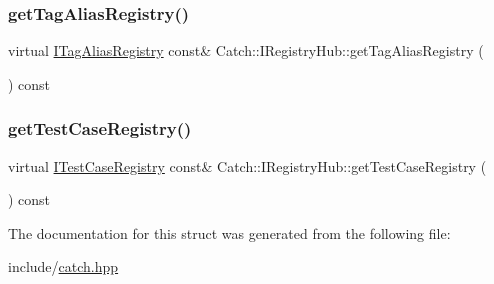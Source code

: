 \mbox{\label{struct_catch_1_1_i_registry_hub_a3c511b1d33e5a6d95c333a0ff387df1a}} 
\subsubsection{\texorpdfstring{get\+Tag\+Alias\+Registry()}{getTagAliasRegistry()}}
{\footnotesize\ttfamily virtual \mbox{\hyperlink{struct_catch_1_1_i_tag_alias_registry}{I\+Tag\+Alias\+Registry}} const\& Catch\+::\+I\+Registry\+Hub\+::get\+Tag\+Alias\+Registry (\begin{DoxyParamCaption}{ }\end{DoxyParamCaption}) const\hspace{0.3cm}{\ttfamily [pure virtual]}}

\mbox{\label{struct_catch_1_1_i_registry_hub_af4f6255f0c0f8f1f179fa9d7d4843076}} 
\subsubsection{\texorpdfstring{get\+Test\+Case\+Registry()}{getTestCaseRegistry()}}
{\footnotesize\ttfamily virtual \mbox{\hyperlink{struct_catch_1_1_i_test_case_registry}{I\+Test\+Case\+Registry}} const\& Catch\+::\+I\+Registry\+Hub\+::get\+Test\+Case\+Registry (\begin{DoxyParamCaption}{ }\end{DoxyParamCaption}) const\hspace{0.3cm}{\ttfamily [pure virtual]}}



The documentation for this struct was generated from the following file\+:\begin{DoxyCompactItemize}
\item 
include/\mbox{\hyperlink{catch_8hpp}{catch.\+hpp}}\end{DoxyCompactItemize}
